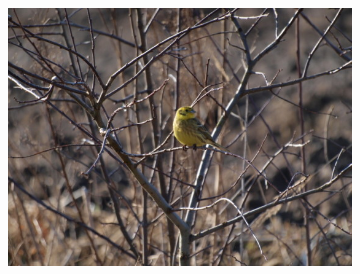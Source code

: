 \begin{figure}[H]
\begin{subfigure}{.32\textwidth}
      \includegraphics[scale=1.0]{obrazky/ORIGstrnad.JPG}
    \end{subfigure}
    \vspace{2pt}
    

\end{figure}
